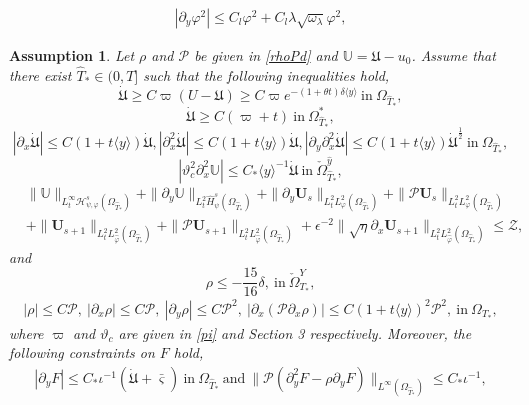 \documentclass[10pt,a4paper]{amsart}
\newtheorem{assumption}{Assumption}
\newcommand\y{{{\langle y \rangle}}}
\begin{document}
\begin{align}
|\partial_{y}\varphi^{2}|
\leq C_{l}\varphi^{2}+C_{l}\lambda\sqrt{\omega_{\lambda}}\varphi^{2},
\end{align}

\begin{assumption}\label{MA}
Let $\rho$ and $\mathcal{P}$ be given in \eqref{rhoPd} and $\mathbb{U}=\mathfrak{U}-u_{0}$. Assume that there exist $\hat{T}_{*}\in(0,T]$  such that the following inequalities hold,
$$\dot{\mathfrak{U}}\geq C\varpi(U-\mathfrak{U})\geq C\varpi e^{-(1+\theta t)\delta\y}~\text{in}~\Omega_{\hat{T}_{*}},$$
$$\dot{\mathfrak{U}}\geq C(\varpi+t)~\text{in}~\Omega_{\hat{T}_{*}}^{*},$$
$$|\partial_{x}\dot{\mathfrak{U}}|\leq C(1+t\y)\dot{\mathfrak{U}},
  |\partial_{x}^{2}\dot{\mathfrak{U}}|\leq C(1+t\y)\dot{\mathfrak{U}},
  |\partial_{y}\partial_{x}^{2}\dot{\mathfrak{U}}|\leq C(1+t\y)\dot{\mathfrak{U}}^{\frac{1}{2}}~\text{in}~\Omega_{\hat{T}_{*}},$$
$$|\vartheta_{c}^{2}\partial_{x}^{2}\mathbb{U}|\leq C_{*}\y^{-1}\dot{\mathfrak{U}}~\text{in}~\check{\Omega}_{\hat{T}_{*}}^{\hat{y}},$$
\begin{align*}
& \|\mathbb{U}\|_{L_{t}^{\infty}\mathcal{H}_{\psi,\varphi}^{s}(\Omega_{\hat{T}_{*}})}
 +\|\partial_{y}\mathbb{U}\|_{L_{t}^{2}\hat{H}_{\psi}^{s}(\Omega_{\hat{T}_{*}})}
 +\|\partial_{y}\mathbf{U}_{s}\|_{L_{t}^{2}L_{\varphi}^{2}(\Omega_{\hat{T}_{*}})}
 +\|\mathcal{P}\mathbf{U}_{s}\|_{L_{t}^{2}L_{\varphi}^{2}(\Omega_{\hat{T}_{*}})}\\
&+\|\mathbf{U}_{s+1}\|_{L_{t}^{2}L_{\hat{\varphi}}^{2}(\Omega_{\hat{T}_{*}})}
 +\|\mathcal{P}\mathbf{U}_{s+1}\|_{L_{t}^{2}L_{\hat{\varphi}}^{2}(\Omega_{\hat{T}_{*}})}
 +\epsilon^{-2}\|\sqrt{\eta}\partial_{x}\mathbf{U}_{s+1}\|_{L_{t}^{2}L_{\hat{\varphi}}^{2}(\Omega_{\hat{T}_{*}})}
\leq \mathcal{Z},
\end{align*}
and
$$\rho\leq -\frac{15}{16}\delta,~\text{in}~\check{\Omega}_{T_{*}}^{Y},$$
\begin{align*}
|\rho|\leq C\mathcal{P},~|\partial_{x}\rho|\leq C\mathcal{P},~
|\partial_{y}\rho|\leq C\mathcal{P}^{2},~
\left|\partial_{x}(\mathcal{P}\partial_{x}\rho)\right|\leq C(1+t\y)^{2}\mathcal{P}^{2},~\text{in}~\Omega_{T_{*}},
\end{align*}
where $\varpi$ and $\vartheta_{c}$ are given in \eqref{pi} and Section 3 respectively.
Moreover, the following constraints on $F$ hold,
\begin{align*}
|\partial_{y}F|\leq C_{*}\iota^{-1}(\dot{\mathfrak{U}}+\bar{\varsigma})~\text{in}~\Omega_{\hat{T}_{*}}~\text{and}~
\|\mathcal{P}(\partial_{y}^{2}F-\rho\partial_{y}F)\|_{L^{\infty}(\Omega_{\hat{T}_{*}})}\leq C_{*}\iota^{-1},

\end{align*}
\end{assumption}
\end{document}
